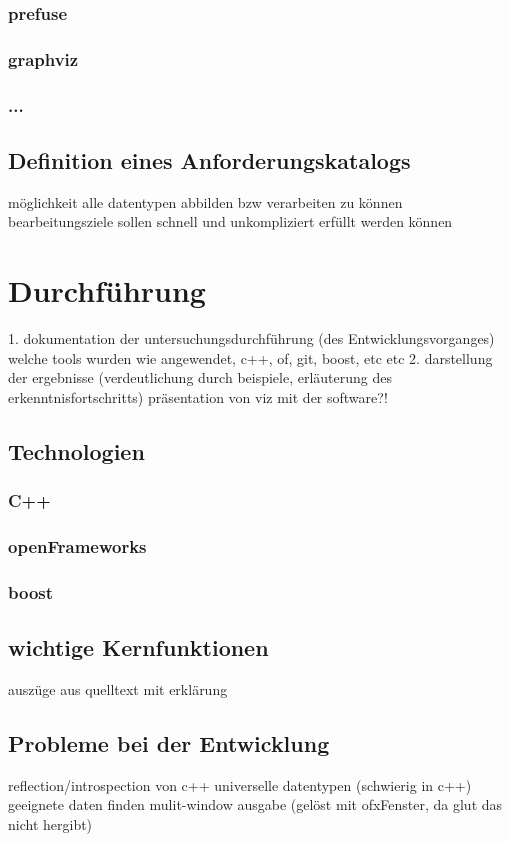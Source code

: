 \documentclass[a4paper, 12pt, onepage, pdftex, headsepline, footsepline]{scrreprt}
\begin{document}
\subsection{prefuse}
\subsection{graphviz}
\subsection{...}
\section{Definition eines Anforderungskatalogs}
möglichkeit alle datentypen abbilden bzw verarbeiten zu können
bearbeitungsziele sollen schnell und unkompliziert erfüllt werden können
\chapter{Durchführung}
1. dokumentation der untersuchungsdurchführung (des Entwicklungsvorganges)
welche tools wurden wie angewendet, c++, of, git, boost, etc etc
2. darstellung der ergebnisse (verdeutlichung durch beispiele, erläuterung des erkenntnisfortschritts)
präsentation von viz mit der software?!
\section{Technologien}
\subsection{C++}
\subsection{openFrameworks}
\subsection{boost}
\section{wichtige Kernfunktionen}
auszüge aus quelltext mit erklärung
\section{Probleme bei der Entwicklung}
reflection/introspection von c++
universelle datentypen (schwierig in c++)
geeignete daten finden
mulit-window ausgabe (gelöst mit ofxFenster, da glut das nicht hergibt)
\end{document}
